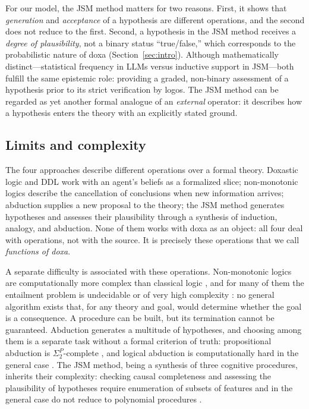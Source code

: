 \documentclass[12pt,a4paper]{article}
\begin{document}
For our model, the JSM method matters for two reasons. First, it shows that
\emph{generation} and \emph{acceptance} of a hypothesis are different
operations, and the second does not reduce to the first. Second, a hypothesis
in the JSM method receives a \emph{degree of plausibility}, not a binary
status ``true/false,'' which corresponds to the probabilistic nature of
doxa (Section~\ref{sec:intro}). Although mathematically distinct—statistical
frequency in LLMs versus inductive support in JSM—both fulfill the same
epistemic role: providing a graded, non-binary assessment of a hypothesis
prior to its strict verification by logos. The JSM method can be regarded
as yet another formal analogue of an \emph{external} operator: it describes
how a hypothesis enters the theory with an explicitly stated ground.

\subsection{Limits and complexity}
\label{sec:limits_theory}

The four approaches describe different operations over a formal theory.
Doxastic logic and DDL work with an agent's beliefs as a formalized slice;
non-monotonic logics describe the cancellation of conclusions when new
information arrives; abduction supplies a new proposal to the theory; the JSM
method generates hypotheses and assesses their plausibility through a synthesis
of induction, analogy, and abduction. None of them works with doxa as an
object: all four deal with operations, not with the source. It is precisely
these operations that we call \emph{functions of doxa}.

A separate difficulty is associated with these operations. Non-monotonic
logics are computationally more complex than classical logic \cite{vinkov},
and for many of them the entailment problem is undecidable or of very high
complexity \cite{cadoli}: no general algorithm exists that, for any theory and
goal, would determine whether the goal is a consequence. A procedure can be
built, but its termination cannot be guaranteed. Abduction generates a
multitude of hypotheses, and choosing among them is a separate task without a
formal criterion of truth: propositional abduction is $\Sigma_2^P$-complete
\cite{eiter95b}, and logical abduction is computationally hard in the general
case \cite{eiter95}. The JSM method, being a synthesis of three cognitive
procedures, inherits their complexity: checking causal completeness and
assessing the plausibility of hypotheses require enumeration of subsets of
features and in the general case do not reduce to polynomial procedures
\cite{finn_dsm}.
\end{document}
